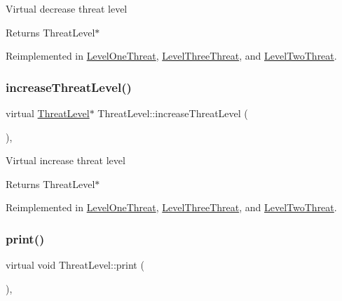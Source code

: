Virtual decrease threat level \begin{DoxyReturn}{Returns}
Threat\+Level$\ast$ 
\end{DoxyReturn}


Reimplemented in \hyperlink{classLevelOneThreat_a9a2899ac02e075905671ea03374cd561}{Level\+One\+Threat}, \hyperlink{classLevelThreeThreat_a98337ab08fe61b136d9c9e48f7ace804}{Level\+Three\+Threat}, and \hyperlink{classLevelTwoThreat_a1d9e88b0f43396721a2f51ae67191359}{Level\+Two\+Threat}.

\mbox{\label{classThreatLevel_ae18f6ebe2186ae1b61d4817196f969e3}} 
\subsubsection{\texorpdfstring{increase\+Threat\+Level()}{increaseThreatLevel()}}
{\footnotesize\ttfamily virtual \hyperlink{classThreatLevel}{Threat\+Level}$\ast$ Threat\+Level\+::increase\+Threat\+Level (\begin{DoxyParamCaption}{ }\end{DoxyParamCaption})\hspace{0.3cm}{\ttfamily [inline]}, {\ttfamily [virtual]}}

Virtual increase threat level \begin{DoxyReturn}{Returns}
Threat\+Level$\ast$ 
\end{DoxyReturn}


Reimplemented in \hyperlink{classLevelOneThreat_afc68f742f1101cb8d533d8cec21bac3f}{Level\+One\+Threat}, \hyperlink{classLevelThreeThreat_a284c2b79a9a85f5e164f15c258c6e9ca}{Level\+Three\+Threat}, and \hyperlink{classLevelTwoThreat_a54b4d396cdd27504f1a8063c04be5bcf}{Level\+Two\+Threat}.

\mbox{\label{classThreatLevel_a5bdff5eeffed8db616ca06091097c138}} 
\subsubsection{\texorpdfstring{print()}{print()}}
{\footnotesize\ttfamily virtual void Threat\+Level\+::print (\begin{DoxyParamCaption}{ }\end{DoxyParamCaption})\hspace{0.3cm}{\ttfamily [inline]}, {\ttfamily [virtual]}}

